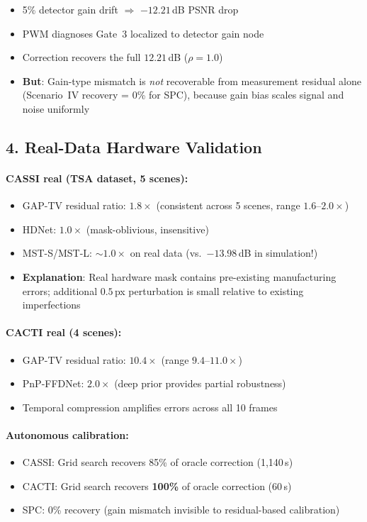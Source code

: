 \documentclass[11pt]{article}
\begin{document}
\begin{itemize}
  \item 5\% detector gain drift $\Rightarrow$ $-12.21$\,dB PSNR drop
  \item PWM diagnoses Gate~3 localized to detector gain node
  \item Correction recovers the full $12.21$\,dB ($\rho = 1.0$)
  \item \textbf{But}: Gain-type mismatch is \emph{not} recoverable from measurement residual alone (Scenario~IV recovery = 0\% for SPC), because gain bias scales signal and noise uniformly
\end{itemize}

\subsection*{4. Real-Data Hardware Validation}

\paragraph{CASSI real (TSA dataset, 5 scenes):}
\begin{itemize}
  \item GAP-TV residual ratio: $1.8\times$ (consistent across 5 scenes, range $1.6$--$2.0\times$)
  \item HDNet: $1.0\times$ (mask-oblivious, insensitive)
  \item MST-S/MST-L: ${\sim}1.0\times$ on real data (vs.\ $-13.98$\,dB in simulation!)
  \item \textbf{Explanation}: Real hardware mask contains pre-existing manufacturing errors; additional $0.5$\,px perturbation is small relative to existing imperfections
\end{itemize}

\paragraph{CACTI real (4 scenes):}
\begin{itemize}
  \item GAP-TV residual ratio: $10.4\times$ (range $9.4$--$11.0\times$)
  \item PnP-FFDNet: $2.0\times$ (deep prior provides partial robustness)
  \item Temporal compression amplifies errors across all 10 frames
\end{itemize}

\paragraph{Autonomous calibration:}
\begin{itemize}
  \item CASSI: Grid search recovers 85\% of oracle correction (1,140\,s)
  \item CACTI: Grid search recovers \textbf{100\%} of oracle correction (60\,s)
  \item SPC: 0\% recovery (gain mismatch invisible to residual-based calibration)
\end{itemize}
\end{document}
